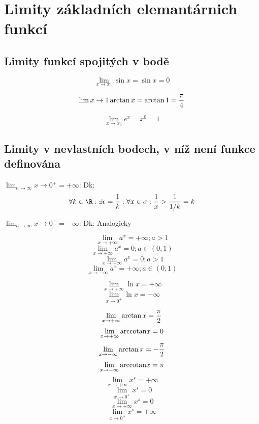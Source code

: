 
\BeginDoc{}
\def\posloup{$\zs{a_n}_{n=1}^{\infty}$}
\def\pos#1{\zs{#1}_{n=1}^{\infty}}
\def\li{\lim_{n\rightarrow\infty}}
\def\lix{\lim_{x\rightarrow x_0}}
\def\r{\rightarrow}
\def\sup{{\rm sup\ }}
\def\sciwinfup{{\rm inf\ }}
\def\su{\sum_{n=1}^{\infty}}
\section{Limity základních elemantárnich funkcí}
\subsection{Limity funkcí spojitých v bodě}
\Pr
$$\lix \sin x = \sin x = 0$$

$$\lim{x\r 1} \arctan x = \arctan 1  = \f \pi 4$$

$$ \lix e^x = x^0 =1$$

\subsection{Limity v nevlastních bodech, v níž není funkce definována}
\Pr
$\li{x\r 0^+}=+\infty$:
Dk: $$\forall k \in \R: \exists\epsilon = \f 1k: \forall x \in \sigma: \f 1x>\f1{1/k} = k$$


$\li{x\r 0^-}=-\infty$:
Dk:
Analogicky

$$\lim_{x\r+\infty} a^x = +\infty;a>1$$
$$\lim_{x\r+\infty} a^x = 0;a\in(0,1)$$
$$\lim_{x\r-\infty} a^x = 0;a>1$$
$$\lim_{x\r-\infty} a^x = +\infty;a\in(0,1)$$

$$\lim_{x\r+\infty} \ln x = +\infty $$
$$\lim_{x\r 0^+}    \ln x = -\infty $$

$$\lim_{x\r +\infty} \arctan x = \f \pi 2  $$
$$\lim_{x\r +\infty} {\rm arccotan} x = 0  $$
$$\lim_{x\r -\infty} \arctan x = -\f \pi 2  $$
$$\lim_{x\r -\infty} {\rm arccotan} x = \pi  $$
$$\lim_{x\r +\infty} x^s= +\infty  $$
$$\lim_{x\r 0^+}     x^s=  0 $$
$$\lim_{x\r +\infty} x^s=  0 $$
$$\lim_{x\r 0^+}     x^s= +\infty  $$

\EndDoc
